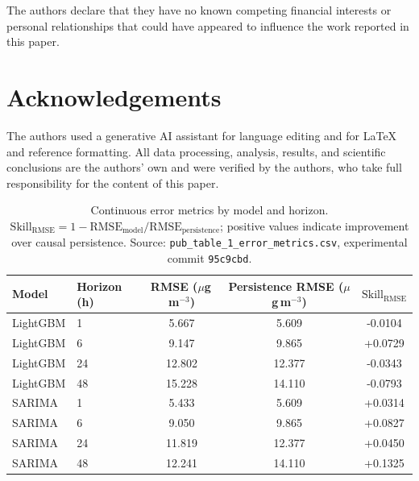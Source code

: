 \documentclass[12pt]{article}
\begin{document}
The authors declare that they have no known competing financial interests or personal relationships that could have appeared to influence the work reported in this paper.

\section*{Acknowledgements}

The authors used a generative AI assistant for language editing and for \LaTeX{} and reference formatting. All data processing, analysis, results, and scientific conclusions are the authors' own and were verified by the authors, who take full responsibility for the content of this paper.






\clearpage
\begin{table}[p]
\centering
\caption{Continuous error metrics by model and horizon.
$\mathrm{Skill}_\mathrm{RMSE} = 1 - \mathrm{RMSE}_\mathrm{model} /
\mathrm{RMSE}_\mathrm{persistence}$; positive values indicate
improvement over causal persistence.
Source: \texttt{pub\_table\_1\_error\_metrics.csv}, experimental commit
\texttt{95c9cbd}.}
\label{tab:error_metrics}
\begin{tabular}{llSSS}
\toprule
Model & Horizon (h) &
  {RMSE ($\mu$g\,m$^{-3}$)} &
  {Persistence RMSE ($\mu$g\,m$^{-3}$)} &
  {$\mathrm{Skill}_\mathrm{RMSE}$} \\
\midrule
LightGBM & 1  & 5.667 & 5.609 & -0.0104 \\
LightGBM & 6  & 9.147 & 9.865 & +0.0729 \\
LightGBM & 24 & 12.802 & 12.377 & -0.0343 \\
LightGBM & 48 & 15.228 & 14.110 & -0.0793 \\
\addlinespace
SARIMA   & 1  & 5.433 & 5.609 & +0.0314 \\
SARIMA   & 6  & 9.050 & 9.865 & +0.0827 \\
SARIMA   & 24 & 11.819 & 12.377 & +0.0450 \\
SARIMA   & 48 & 12.241 & 14.110 & +0.1325 \\
\bottomrule
\end{tabular}
\end{table}
\end{document}
